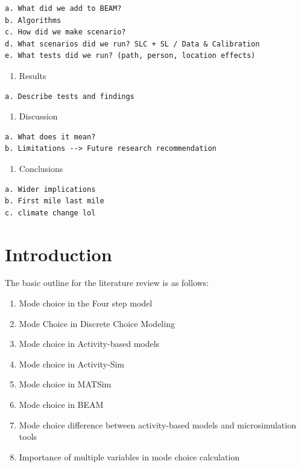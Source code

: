 \documentclass[12pt, oneside, openright]{byuthesis}
\providecommand{\tightlist}{%
  \setlength{\itemsep}{0pt}\setlength{\parskip}{0pt}}
\begin{document}
\begin{verbatim}
a. What did we add to BEAM?
b. Algorithms
c. How did we make scenario?
d. What scenarios did we run? SLC + SL / Data & Calibration
e. What tests did we run? (path, person, location effects)
\end{verbatim}

\begin{enumerate}
\def\labelenumi{\arabic{enumi}.}
\setcounter{enumi}{3}
\tightlist
\item
  Results
\end{enumerate}

\begin{verbatim}
a. Describe tests and findings
\end{verbatim}

\begin{enumerate}
\def\labelenumi{\arabic{enumi}.}
\setcounter{enumi}{4}
\tightlist
\item
  Discussion
\end{enumerate}

\begin{verbatim}
a. What does it mean?
b. Limitations --> Future research recommendation
\end{verbatim}

\begin{enumerate}
\def\labelenumi{\arabic{enumi}.}
\setcounter{enumi}{5}
\tightlist
\item
  Conclusions
\end{enumerate}

\begin{verbatim}
a. Wider implications
b. First mile last mile
c. climate change lol
\end{verbatim}

\hypertarget{introduction}{%
\chapter{Introduction}\label{introduction}}

The basic outline for the literature review is as follows:

\begin{enumerate}
\def\labelenumi{\alph{enumi}.}
\tightlist
\item
  Mode choice in the Four step model
\item
  Mode Choice in Discrete Choice Modeling
\item
  Mode choice in Activity-based models
\item
  Mode choice in Activity-Sim
\item
  Mode choice in MATSim
\item
  Mode choice in BEAM
\item
  Mode choice difference between activity-based models and microsimulation tools
\item
  Importance of multiple variables in mode choice calculation
\end{enumerate}
\end{document}
